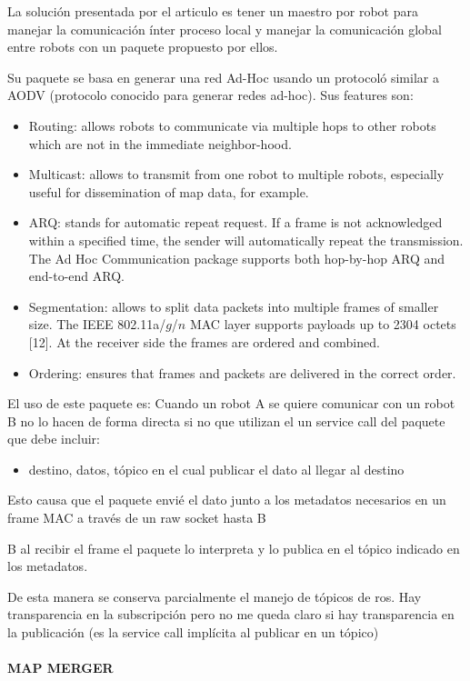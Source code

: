 La solución presentada por el articulo es tener un maestro por robot para manejar la comunicación ínter proceso local y manejar la comunicación global entre robots con un paquete propuesto por ellos. 

Su paquete se basa en generar una red Ad-Hoc usando un protocoló similar a AODV (protocolo conocido para generar redes ad-hoc). Sus features son:
\begin{itemize}
\item Routing: allows robots to communicate via multiple hops to other robots which are not in the immediate neighbor-hood.
\item Multicast: allows to transmit from one robot to multiple robots, especially useful for dissemination of map data, for example.
\item ARQ: stands for automatic repeat request. If a frame is not acknowledged within a specified time, the sender will automatically repeat the transmission. The Ad Hoc Communication package supports both hop-by-hop ARQ and end-to-end ARQ.
\item Segmentation: allows to split data packets into multiple frames of smaller size. The IEEE 802.11a/$g$/$n$ MAC layer supports payloads up to 2304 octets [12]. At the receiver side the frames are ordered and combined.
\item Ordering: ensures that frames and packets are delivered in the correct order.
\end{itemize}

El uso de este paquete es:
Cuando un robot A se quiere comunicar con un robot B no lo hacen de forma directa si no que utilizan el un service call del paquete que debe incluir:
\begin{itemize}
  \item destino, datos, tópico en el cual publicar el dato al llegar al destino
\end{itemize}

Esto causa que el paquete envié el dato junto a los metadatos necesarios en un frame MAC a través de un raw socket hasta B

B al recibir el frame el paquete lo interpreta y lo publica en el tópico indicado en los metadatos.

De esta manera se conserva parcialmente el manejo de tópicos de ros. Hay transparencia en la subscripción pero no me queda claro si hay transparencia en la publicación (es la service call implícita al publicar en un tópico)

\paragraph{MAP MERGER}

